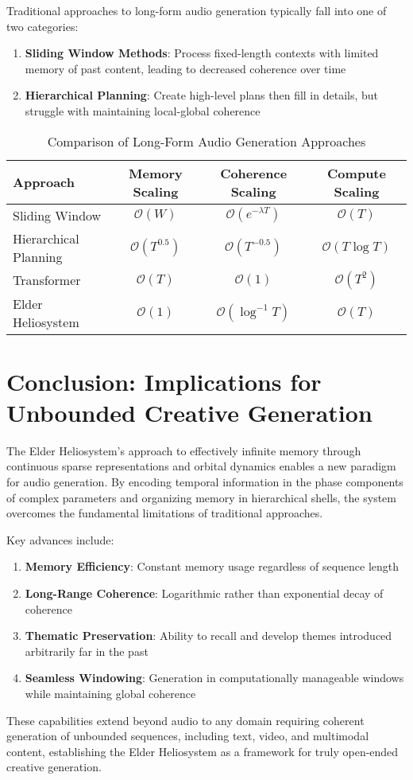 Traditional approaches to long-form audio generation typically fall into one of two categories:

\begin{enumerate}
    \item \textbf{Sliding Window Methods}: Process fixed-length contexts with limited memory of past content, leading to decreased coherence over time
    \item \textbf{Hierarchical Planning}: Create high-level plans then fill in details, but struggle with maintaining local-global coherence
\end{enumerate}

\begin{table}[h]
\centering
\caption{Comparison of Long-Form Audio Generation Approaches}
\begin{tabular}{|l|c|c|c|}
\hline
\textbf{Approach} & \textbf{Memory Scaling} & \textbf{Coherence Scaling} & \textbf{Compute Scaling} \\
\hline
Sliding Window & $\mathcal{O}(W)$ & $\mathcal{O}(e^{-\lambda T})$ & $\mathcal{O}(T)$ \\
Hierarchical Planning & $\mathcal{O}(T^{0.5})$ & $\mathcal{O}(T^{-0.5})$ & $\mathcal{O}(T \log T)$ \\
Transformer & $\mathcal{O}(T)$ & $\mathcal{O}(1)$ & $\mathcal{O}(T^2)$ \\
Elder Heliosystem & $\mathcal{O}(1)$ & $\mathcal{O}(\log^{-1} T)$ & $\mathcal{O}(T)$ \\
\hline
\end{tabular}
\end{table}

\section{Conclusion: Implications for Unbounded Creative Generation}

The Elder Heliosystem's approach to effectively infinite memory through continuous sparse representations and orbital dynamics enables a new paradigm for audio generation. By encoding temporal information in the phase components of complex parameters and organizing memory in hierarchical shells, the system overcomes the fundamental limitations of traditional approaches.

Key advances include:

\begin{enumerate}
    \item \textbf{Memory Efficiency}: Constant memory usage regardless of sequence length
    \item \textbf{Long-Range Coherence}: Logarithmic rather than exponential decay of coherence
    \item \textbf{Thematic Preservation}: Ability to recall and develop themes introduced arbitrarily far in the past
    \item \textbf{Seamless Windowing}: Generation in computationally manageable windows while maintaining global coherence
\end{enumerate}

These capabilities extend beyond audio to any domain requiring coherent generation of unbounded sequences, including text, video, and multimodal content, establishing the Elder Heliosystem as a framework for truly open-ended creative generation.